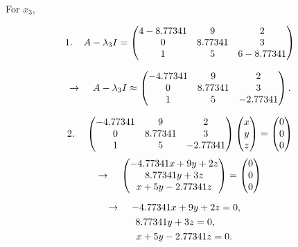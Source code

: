 \documentclass{article}
\begin{document}
\vspace{10mm}

For \( x_3 \),

\[
1. \hspace{4mm} A - \lambda_3 I = \begin{pmatrix} 4 - 8.77341 & 9 & 2 \\ 0 & 8.77341 & 3 \\ 1 & 5 & 6 - 8.77341 \end{pmatrix}
\]

\[
\rightarrow \hspace{4mm} A - \lambda_3 I \approx \begin{pmatrix} -4.77341 & 9 & 2 \\ 0 & 8.77341 & 3 \\ 1 & 5 & -2.77341 \end{pmatrix}.
\]

\vspace{2mm}

\[
2. \hspace{4mm} \begin{pmatrix} -4.77341 & 9 & 2 \\ 0 & 8.77341 & 3 \\ 1 & 5 & -2.77341 \end{pmatrix} \begin{pmatrix} x \\ y \\ z \end{pmatrix} = \begin{pmatrix} 0 \\ 0 \\ 0 \end{pmatrix}
\]
\[
\rightarrow \hspace{4mm} \begin{pmatrix} -4.77341 x + 9 y + 2 z \\ 8.77341 y + 3 z \\ x + 5 y - 2.77341 z \end{pmatrix} = \begin{pmatrix} 0 \\ 0 \\ 0 \end{pmatrix}
\]

\[
\hspace{-4mm} \rightarrow \hspace{4mm} -4.77341 x + 9 y + 2 z = 0,
\]
\[
\hspace{-2.5mm} \hspace{-1mm} 8.77341 y + 3 z = 0,
\]
\[
\hspace{-2mm} \hspace{5mm} x + 5 y - 2.77341 z = 0.
\]
\end{document}
